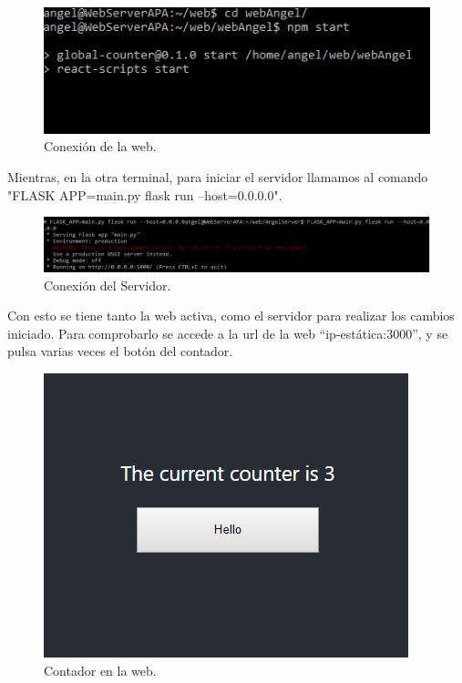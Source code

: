 \documentclass[10pt]{article}
\begin{document}
\begin{figure}[h!]
 \includegraphics[width=\linewidth]{./Web/Azure/ConexionWeb.png}
 \caption{Conexión de la web.}
\end{figure}

Mientras, en la otra terminal, para iniciar el servidor llamamos al comando "FLASK APP=main.py flask run –host=0.0.0.0".

\begin{figure}[h!]
 \includegraphics[width=\linewidth]{./Web/Azure/ConexionServer.png}
 \caption{Conexión del Servidor.}
\end{figure}

Con esto se tiene tanto la web activa, como el servidor para realizar los cambios
iniciado. Para comprobarlo se accede a la url de la web “ip-estática:3000”, y se
pulsa varias veces el botón del contador.

\begin{figure}[h!]
 \includegraphics[width=\linewidth]{./Web/Azure/Contador.png}
 \caption{Contador en la web.}
\end{figure}
\end{document}
